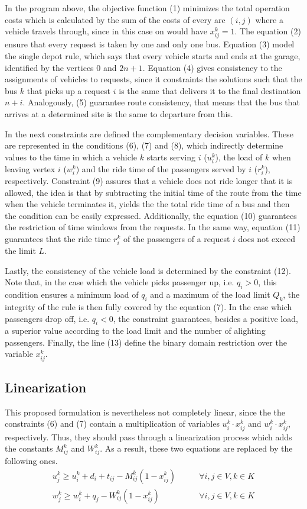\documentclass[tuberlin,cic,tc,openright,english,noabntcite,oneside]{iiufrgs}
\begin{document}
In the program above, the objective function (1) minimizes the total operation costs which is calculated by the sum of the costs of every arc $(i,j)$ where a vehicle travels through, since in this case on would have $x_{ij}^k = 1$. The equation (2) ensure that every request is taken by one and only one bus. Equation (3) model the single depot rule, which says that every vehicle starts and ends at the garage, identified by the vertices $0$ and $2n+1$. Equation (4) gives consistency to the assignments of vehicles to requests, since it constraints the solutions such that the bus $k$ that picks up a request $i$ is the same that delivers it to the final destination $n+i$. Analogously, (5) guarantee route consistency, that means that the bus that arrives at a determined site is the same to departure from this.

In the next constraints are defined the complementary decision variables. These are represented in the conditions (6), (7) and (8), which indirectly determine values to the time in which a vehicle $k$ starts serving $i$ ($u_i^k$), the load of $k$ when leaving vertex $i$ ($w_i^k$) and the ride time of the passengers served by $i$ ($r_i^k$), respectively. Constraint (9) assures that a vehicle does not ride longer that it is allowed, the idea is that by subtracting the initial time of the route from the time when the vehicle terminates it, yields the the total ride time of a bus and then the condition can be easily expressed. Additionally, the equation (10) guarantees the restriction of time windows from the requests. In the same way, equation (11) guarantees that the ride time $r_i^k$ of the passengers of a request $i$ does not exceed the limit $L$.

Lastly, the consistency of the vehicle load is determined by the constraint (12). Note that, in the case which the vehicle picks passenger up, i.e. $q_i > 0$, this condition ensures a minimum load of $q_i$ and a maximum of the load limit $Q_k$, the integrity of the rule is then fully covered by the equation (7). In the case which passengers drop off, i.e. $q_i < 0$, the constraint guarantees, besides a positive load, a superior value according to the load limit and the number of alighting passengers. Finally, the line (13) define the binary domain restriction over the variable $x_{ij}^k$.

\subsection{Linearization}
This proposed formulation is nevertheless not completely linear, since the the constraints (6) and (7) contain a multiplication of variables $u_i^k \cdot x_{ij}^k$ and $w_i^k \cdot x_{ij}^k$, respectively. Thus, they should pass through a linearization process which adds the constants $M_{ij}^k$ and $W_{ij}^k$. As a result, these two equations are replaced by the following ones.
\begin{align}
	u_j^k \geq u_i^k + d_i + t_{ij} - M_{ij}^k(1 - x_{ij}^k)	\qquad & \forall i,j \in V, k \in K \\
	w_j^k \geq w_i^k + q_j - W_{ij}^k(1 - x_{ij}^k)				\qquad & \forall i,j \in V, k \in K
\end{align}
\end{document}
